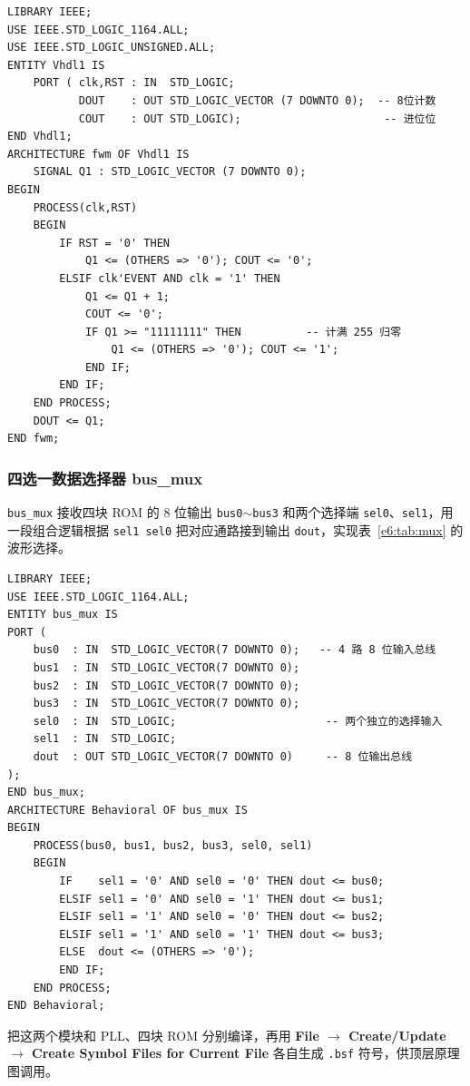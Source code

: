 \documentclass{ctexrep}
\begin{document}
\begin{verbatim}
LIBRARY IEEE;
USE IEEE.STD_LOGIC_1164.ALL;
USE IEEE.STD_LOGIC_UNSIGNED.ALL;
ENTITY Vhdl1 IS
    PORT ( clk,RST : IN  STD_LOGIC;
           DOUT    : OUT STD_LOGIC_VECTOR (7 DOWNTO 0);  -- 8位计数
           COUT    : OUT STD_LOGIC);                      -- 进位位
END Vhdl1;
ARCHITECTURE fwm OF Vhdl1 IS
    SIGNAL Q1 : STD_LOGIC_VECTOR (7 DOWNTO 0);
BEGIN
    PROCESS(clk,RST)
    BEGIN
        IF RST = '0' THEN
            Q1 <= (OTHERS => '0'); COUT <= '0';
        ELSIF clk'EVENT AND clk = '1' THEN
            Q1 <= Q1 + 1;
            COUT <= '0';
            IF Q1 >= "11111111" THEN          -- 计满 255 归零
                Q1 <= (OTHERS => '0'); COUT <= '1';
            END IF;
        END IF;
    END PROCESS;
    DOUT <= Q1;
END fwm;
\end{verbatim}
\label{e6:lst:vhdl1}

\subsubsection{四选一数据选择器 bus\_mux}

\texttt{bus\_mux} 接收四块 ROM 的 8 位输出 \texttt{bus0}$\sim$\texttt{bus3} 和两个选择端 \texttt{sel0}、\texttt{sel1}，用一段组合逻辑根据 \texttt{sel1 sel0} 把对应通路接到输出 \texttt{dout}，实现表~\ref{e6:tab:mux} 的波形选择。

\begin{verbatim}
LIBRARY IEEE;
USE IEEE.STD_LOGIC_1164.ALL;
ENTITY bus_mux IS
PORT (
    bus0  : IN  STD_LOGIC_VECTOR(7 DOWNTO 0);   -- 4 路 8 位输入总线
    bus1  : IN  STD_LOGIC_VECTOR(7 DOWNTO 0);
    bus2  : IN  STD_LOGIC_VECTOR(7 DOWNTO 0);
    bus3  : IN  STD_LOGIC_VECTOR(7 DOWNTO 0);
    sel0  : IN  STD_LOGIC;                       -- 两个独立的选择输入
    sel1  : IN  STD_LOGIC;
    dout  : OUT STD_LOGIC_VECTOR(7 DOWNTO 0)     -- 8 位输出总线
);
END bus_mux;
ARCHITECTURE Behavioral OF bus_mux IS
BEGIN
    PROCESS(bus0, bus1, bus2, bus3, sel0, sel1)
    BEGIN
        IF    sel1 = '0' AND sel0 = '0' THEN dout <= bus0;
        ELSIF sel1 = '0' AND sel0 = '1' THEN dout <= bus1;
        ELSIF sel1 = '1' AND sel0 = '0' THEN dout <= bus2;
        ELSIF sel1 = '1' AND sel0 = '1' THEN dout <= bus3;
        ELSE  dout <= (OTHERS => '0');
        END IF;
    END PROCESS;
END Behavioral;
\end{verbatim}
\label{e6:lst:busmux}

把这两个模块和 PLL、四块 ROM 分别编译，再用 \textbf{File $\rightarrow$ Create/Update $\rightarrow$ Create Symbol Files for Current File} 各自生成 \texttt{.bsf} 符号，供顶层原理图调用。
\end{document}
